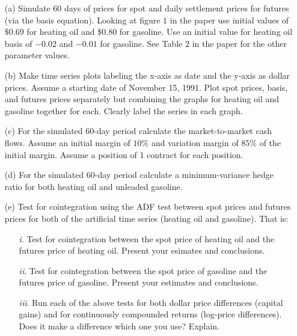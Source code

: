 \documentclass[12pt]{article}
\begin{document}
 \begin{itemize}
  \item[(a)] Simulate 60 days of prices for spot and daily settlement prices for futures (via the basis equation).
	         Looking at figure $1$ in the paper use initial values of $\$0.69$ for heating oil and $\$0.80$ for
			 gasoline. Use an initial value for heating oil basis of $-0.02$ and $-0.01$ for gasoline.
			 See Table $2$ in the paper for the other parameter values. 
  \item[(b)] Make time series plots labeling the x-axis as date and the y-axis as dollar prices. Assume a starting date
	         of November 15, 1991. Plot spot prices, basis, and futures prices separately but combining the graphs for 
			 heating oil and gasoline together for each. Clearly label the series in each graph. 
  \item[(c)] For the simulated 60-day period calculate the market-to-market cash flows. Assume an initial margin
	         of $10\%$ and variation margin of $85\%$ of the initial margin. Assume a position of 1 contract for each
			 position.
  \item[(d)] For the simulated 60-day period calculate a minimum-variance hedge ratio for both heating oil and unleaded
	         gasoline.

  \item[(e)] Test for cointegration using the ADF test between spot prices and futures prices for both of the artificial time series (heating oil and gasoline). That is:
	\begin{itemize}
	 \item[\textit{i}.]   Test for cointegration between the spot price of heating oil and the futures price of heating oil. Present your esimates and conclusions.
	 \item[\textit{ii}.]  Test for cointegration between the spot price of gasoline and the futures price of gasoline. Present your estimates and conclusions.
	 \item[\textit{iii}.] Run each of the above tests for both dollar price differences (capital gains) and for continuously compounded returns (log-price differences). Does
		                  it make a difference which one you use? Explain.
	\end{itemize}
 \end{itemize}
\end{document}
